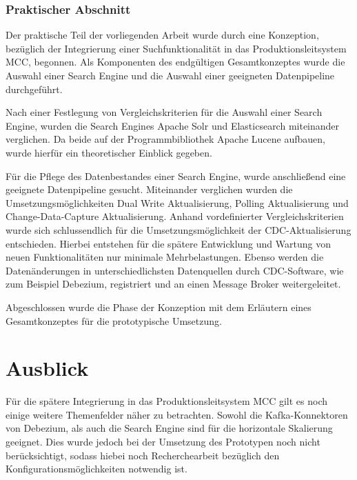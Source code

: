 \subsubsection{Praktischer Abschnitt}

Der praktische Teil der vorliegenden Arbeit wurde durch eine Konzeption, bezüglich der Integrierung einer Suchfunktionalität in das Produktionsleitsystem MCC, begonnen. Als Komponenten des endgültigen Gesamtkonzeptes wurde die Auswahl einer Search Engine und die Auswahl einer geeigneten Datenpipeline durchgeführt.

Nach einer Festlegung von Vergleichskriterien für die Auswahl einer Search Engine, wurden die Search Engines \glqq Apache Solr\grqq{} und \glqq Elasticsearch\grqq{} miteinander verglichen. Da beide auf der Programmbibliothek \glqq Apache Lucene\grqq{} aufbauen, wurde hierfür ein theoretischer Einblick gegeben.

Für die Pflege des Datenbestandes einer Search Engine, wurde anschließend eine geeignete Datenpipeline gesucht. Miteinander verglichen wurden die Umsetzungsmöglichkeiten \glqq Dual Write Aktualisierung\grqq{}, \glqq Polling Aktualisierung\grqq{} und \glqq Change-Data-Capture Aktualisierung\grqq{}. Anhand vordefinierter Vergleichskriterien wurde sich schlussendlich für die Umsetzungsmöglichkeit der CDC-Aktualisierung entschieden. Hierbei entstehen für die spätere Entwicklung und Wartung von neuen Funktionalitäten nur minimale Mehrbelastungen. Ebenso werden die Datenänderungen in unterschiedlichsten Datenquellen durch CDC-Software, wie zum Beispiel \glqq Debezium\grqq{}, registriert und an einen Message Broker weitergeleitet.

Abgeschlossen wurde die Phase der Konzeption mit dem Erläutern eines Gesamtkonzeptes für die prototypische Umsetzung.


\section{Ausblick\label{sec6.2:Unterpunkt-2}}

Für die spätere Integrierung in das Produktionsleitsystem MCC gilt es noch einige weitere Themenfelder näher zu betrachten. Sowohl die Kafka-Konnektoren von Debezium, als auch die Search Engine sind für die horizontale Skalierung geeignet. Dies wurde jedoch bei der Umsetzung des Prototypen noch nicht berücksichtigt, sodass hiebei noch Recherchearbeit bezüglich den Konfigurationsmöglichkeiten notwendig ist.

